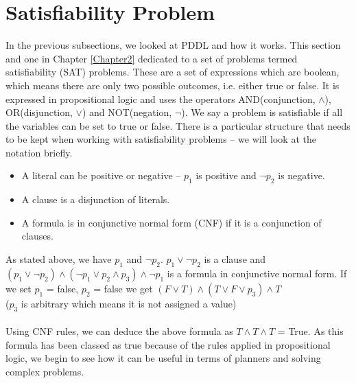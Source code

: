 \section{Satisfiability Problem}
In the previous subsections, we looked at PDDL and how it works. This section and one in Chapter \ref{Chapter2} dedicated to a set of problems termed satisfiability (SAT) problems. These are a set of expressions which are boolean, which means there are only two possible outcomes, i.e. either true or false. It is expressed in propositional logic and uses the operators AND(conjunction, $\wedge$), OR(disjunction, $\vee$) and NOT(negation, $\neg$). We say a problem is satisfiable if all the variables can be set to true or false. There is a particular structure that needs to be kept when working with satisfiability problems – we will look at the notation briefly. 
\begin{itemize}
\item A literal can be positive or negative – $p_1$ is positive and $\neg p_2$ is negative. 
\item A clause is a disjunction of literals.
\item A formula is in conjunctive normal form (CNF) if it is a conjunction of clauses.\cite{SurverySat}
\end{itemize}
As stated above, we have $p_1$ and $\neg p_2$. $p_1\vee \neg p_2$ is a clause and $(p_1\vee \neg p_2) \wedge (\neg p_1 \vee p_2 \wedge p_3) \wedge \neg p_1$ is a formula in conjunctive normal form. 
If we set $p_1$ = false, $p_2$ = false we get $(F \vee T) \wedge(T \vee F \vee p_3) \wedge T$ 
\\
($p_3$ is arbitrary which means it is not assigned a value)
\\
\\
Using CNF rules\cite{Conjunctive}, we can deduce the above formula as $T \wedge T \wedge T$ = True.
As this formula has been classed as true because of the rules applied in propositional logic, we begin to see how it can be useful in terms of planners and solving complex problems.